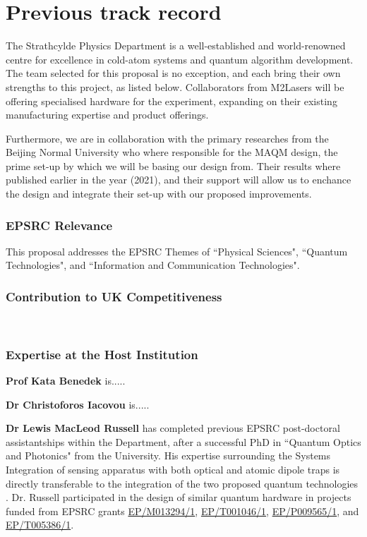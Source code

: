 \documentclass{epsrc}
\begin{document}
\part{Previous track record}

The Strathcylde Physics Department is a well-established and world-renowned centre for excellence in cold-atom systems and quantum algorithm development. The team selected for this proposal is no exception, and each bring their own strengths to this project, as listed below. Collaborators from M2Lasers will be offering specialised hardware for the experiment, expanding on their existing manufacturing expertise and product offerings. 

Furthermore, we are in collaboration with the primary researches from the Beijing Normal University who where responsible for the MAQM design, the prime set-up by which we will be basing our design from. Their results where published earlier in the year (2021), and their support will allow us to enchance the design and integrate their set-up with our proposed improvements.   \\

\section{EPSRC Relevance}

This proposal addresses the EPSRC Themes of ``Physical Sciences", ``Quantum Technologies", and ``Information and Communication Technologies". \\

\section{Contribution to UK Competitiveness}

\lipsum[75] \\

\section{Expertise at the Host Institution}

\textbf{Prof Kata Benedek} is..... \lipsum[66]

\textbf{Dr Christoforos Iacovou} is..... \lipsum[75]

\textbf{Dr Lewis MacLeod Russell} has completed previous EPSRC post-doctoral assistantships within the Department, after a successful PhD in ``Quantum Optics and Photonics" from the University. His expertise surrounding the Systems Integration of sensing apparatus with both optical and atomic dipole traps is directly transferable to the integration of the two proposed quantum technologies . Dr. Russell participated in the design of similar quantum hardware in projects funded from EPSRC grants \href{https://gow.epsrc.ukri.org/NGBOViewGrant.aspx?GrantRef=EP/M013294/1}{EP/M013294/1}, \href{https://gow.epsrc.ukri.org/NGBOViewGrant.aspx?GrantRef=EP/T001046/1}{EP/T001046/1}, \href{https://gow.epsrc.ukri.org/NGBOViewGrant.aspx?GrantRef=EP/P009565/1}{EP/P009565/1}, and \href{https://gow.epsrc.ukri.org/NGBOViewGrant.aspx?GrantRef=EP/T005386/1}{EP/T005386/1}.    \\
\end{document}
